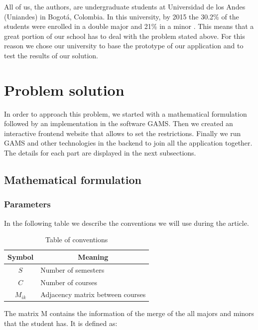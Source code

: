 \documentclass[journal]{IEEEtran}
\begin{document}
All of us, the authors, are undergraduate students at Universidad de los Andes (Uniandes) in Bogot\'a, Colombia. In this university, by 2015 the 30.2\% of the students were enrolled in a double major and 21\% in a minor \cite{boletinuniandes}. This means that a great portion of our school has to deal with the problem stated above. For this reason we chose our university to base the prototype of our application and to test the results of our solution. \\

\section{Problem solution}

In order to approach this problem, we started with a mathematical formulation followed by an implementation in the software GAMS. Then we created an interactive frontend website that allows to set the restrictions. Finally we run GAMS and other technologies in the backend to join all the application together. The details for each part are displayed in the next subsections. \\

\subsection{Mathematical formulation}

\subsubsection{Parameters}
In the following table we describe the conventions we will use during the article. \\

\begin{table}[h!]
	\centering
	\caption{Table of conventions}
	\label{conventions}
	\begin{tabular}{|c||l|}
		\hline
		\textbf{Symbol} & \multicolumn{1}{c|}{\textbf{Meaning}} \\ \hline
		$S$ 			& Number of semesters                   \\ \hline
		$C$				& Number of courses                     \\ \hline
        $M_{ik}$        & Adjacency matrix between courses      \\ \hline
	\end{tabular}
\end{table}

The matrix M contains the information of the merge of the all majors and minors that the student has. It is defined as:
\end{document}
